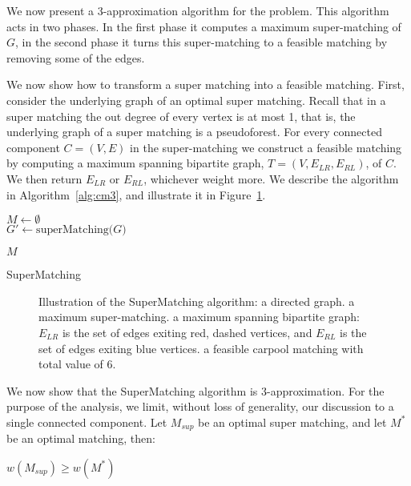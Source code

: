 \label{sec:cm}
We now present a 3-app\-roximation algorithm for the \textsc{\CARPOOL{}} problem.
This algorithm acts in two phases.
In the first phase it computes a maximum super-matching of $G$, 
in the second phase it turns this super-matching to a feasible matching
by removing some of the edges.

We now show how to transform a super matching into a feasible matching.
First, consider the underlying graph of an optimal super matching.
Recall that in a super matching the out degree of every vertex is at most 1,
that is, the underlying graph of a super matching is a pseudoforest.
For every connected component $C = (V, E)$ 
in the super-matching we construct a feasible matching by
computing a maximum spanning bipartite graph, $T = (V, E_{LR}, E_{RL})$, 
of $C$. 
We then return $E_{LR}$ or $E_{RL}$, whichever weight more. 
We describe the algorithm in Algorithm~\ref{alg:cm3}, 
and illustrate it in Figure~\ref{fig:spanning-bipartite-graph}.   

\begin{algorithm}[t]

$M \leftarrow \emptyset$								\\
$G' \leftarrow \text{superMatching($G$)}$				\\


\Return $M$
\caption{
\label{alg:cm3}
SuperMatching}
\end{algorithm}

\begin{figure}
\centering

\caption[]{
\label{fig:spanning-bipartite-graph}
Illustration of the SuperMatching algorithm:
 a directed graph. 
 a maximum super-matching.  
 a maximum spanning bipartite graph:
$E_{LR}$ is the set of edges exiting red, dashed vertices, 
and $E_{RL}$ is the set of edges exiting blue vertices.
 a feasible carpool matching with total value of 6.   
}
\end{figure}

We now show that the SuperMatching algorithm is 3-approximation.
For the purpose of the analysis, we limit, without loss of generality, 
our discussion to a single connected component.
Let $M_{sup}$ be an optimal super matching, 
and let $M^*$ be an optimal matching, then:
\begin{observation}
\label{lm:super-geq-m^*}
$w(M_{sup}) \geq w(M^*)$
\end{observation}


